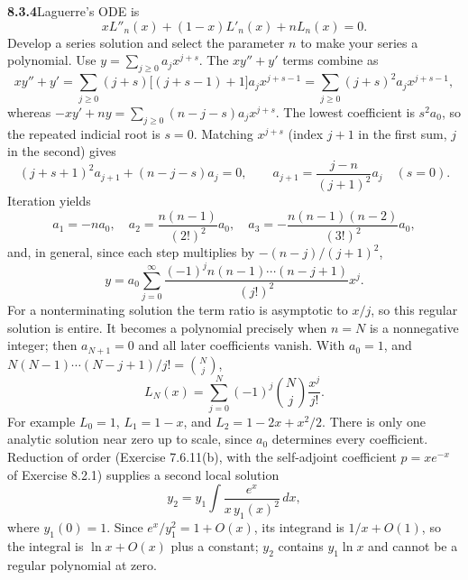 \par\bigskip
\noindent\textbf{8.3.4}\quad Laguerre's ODE is
\[
xL''_{n}(x)+(1-x)L'_{n}(x)+nL_{n}(x)=0.
\]
Develop a series solution and select the parameter $n$ to make your series a
polynomial.
\solution
Use $y=\sum_{j\ge0}a_jx^{j+s}$.  The $xy''+y'$ terms combine as
\[
xy''+y'=\sum_{j\ge0}(j+s)\bigl[(j+s-1)+1\bigr]a_jx^{j+s-1}
=\sum_{j\ge0}(j+s)^2a_jx^{j+s-1},
\]
whereas $-xy'+ny=\sum_{j\ge0}(n-j-s)a_jx^{j+s}$.
The lowest coefficient is $s^2a_0$, so the repeated indicial root
is $s=0$.  Matching $x^{j+s}$ (index $j+1$ in the first sum, $j$ in
the second) gives
\[
(j+s+1)^2a_{j+1}+(n-j-s)a_j=0,
\qquad
\boxed{a_{j+1}=\frac{j-n}{(j+1)^2}a_j\quad(s=0)}.
\]
Iteration yields
\[
a_1=-na_0,\quad a_2=\frac{n(n-1)}{(2!)^2}a_0,
\quad a_3=-\frac{n(n-1)(n-2)}{(3!)^2}a_0,
\]
and, in general, since each step multiplies by $-(n-j)/(j+1)^2$,
\[
y=a_0\sum_{j=0}^{\infty}
\frac{(-1)^j n(n-1)\cdots(n-j+1)}{(j!)^2}x^j.
\]
For a nonterminating solution the term ratio is asymptotic to $x/j$,
so this regular solution is entire.  It becomes a polynomial precisely
when $n=N$ is a nonnegative integer; then $a_{N+1}=0$ and all later
coefficients vanish.  With $a_0=1$, and
$N(N-1)\cdots(N-j+1)/j!=\binom Nj$,
\[
\boxed{L_N(x)=\sum_{j=0}^{N}(-1)^j\binom Nj\frac{x^j}{j!}}.
\]
For example $L_0=1$, $L_1=1-x$, and $L_2=1-2x+x^2/2$.
There is only one analytic solution near zero up to scale, since
$a_0$ determines every coefficient.  Reduction of order
(Exercise 7.6.11(b), with the self-adjoint coefficient $p=xe^{-x}$ of
Exercise 8.2.1) supplies a second local solution
\[
y_2=y_1\int\frac{e^x}{x\,y_1(x)^2}\,dx,
\]
where $y_1(0)=1$.  Since $e^x/y_1^2=1+O(x)$, its integrand is
$1/x+O(1)$, so the integral is $\ln x+O(x)$ plus a constant; $y_2$
contains $y_1\ln x$ and cannot be a regular polynomial at zero.


